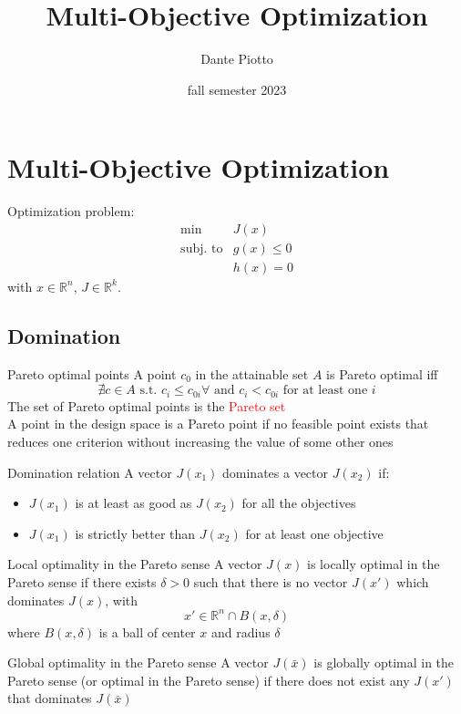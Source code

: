 \documentclass{book}
\title{Multi-Objective Optimization}
\author{Dante Piotto}
\date{fall semester 2023}
\newcommand{\R}{\mathbb{R}}
\begin{document}
\maketitle
\tableofcontents

\chapter{Multi-Objective Optimization}
Optimization problem:
\begin{align*}
    \min &J(x)\\
    \text{subj. to} & g(x)\leq 0 \\
    & h(x) = 0
\end{align*}        
with $x\in\R^n$, $J\in\R^k$.
\section{Domination}
\begin{Definition}{Pareto optimal points}{}
    A point $c_0$ in the attainable set $A$ is Pareto optimal iff 
    \[
        \nexists c \in A \text{ s.t. } c_i\leq c_{0i} \forall \text{ and } c_i < c_{0i} \text{ for at least one } i
    \]
    The set of Pareto optimal points is the \textcolor{red}{Pareto set}\\
    A point in the design space is a Pareto point if no feasible point exists that reduces one criterion without increasing the value of some other ones
\end{Definition}
\begin{Definition}{Domination relation}{}
    A vector $J(x_1)$ dominates a vector $J(x_2)$ if:
    \begin{itemize}
        \item $J(x_1)$ is at least as good as $J(x_2)$ for all the objectives 
        \item $J(x_1)$ is strictly better than $J(x_2)$ for at least one objective
    \end{itemize}
\end{Definition}
\begin{Definition}{Local optimality in the Pareto sense}{}
    A vector $J(x)$ is locally optimal in the Pareto sense if there exists $\delta>0$ such that there is no vector $J(x')$ which dominates $J(x)$, with 
    \[
        x'\in\R^n \cap B(x,\delta)
    \]
    where $B(x,\delta)$ is a ball of center $x$ and radius $\delta$
\end{Definition}
\begin{Definition}{Global optimality in the Pareto sense}{} 
    A vector $J(\bar{x})$ is globally optimal in the Pareto sense (or optimal in the Pareto sense) if there does not exist any $J(x')$ that dominates $J(\bar{x})$ 
\end{Definition}
\end{document}
